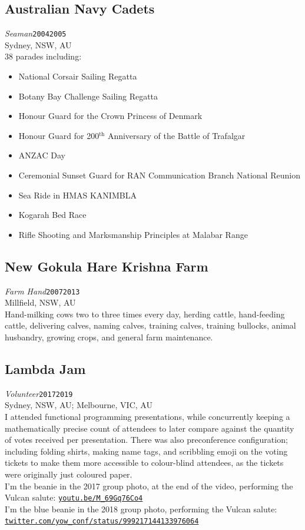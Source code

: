 \documentclass[12pt,a4paper,oneside]{article}
\newcommand{\xp}[6]{{\normalsize\textit{#1}\hfill\texttt{#5}\\\phantom{menace}\hfill#2, #3, #4}\\}
\newcommand{\textapprox}{\raisebox{0.5ex}{\texttildelow}}
\begin{document}
\subsection{Australian Navy Cadets}
\xp{Seaman}{Sydney}{NSW}{AU}{2004\textapprox{}2005}
\\38 parades including:
\begin{itemize}
	\item National Corsair Sailing Regatta
	\item Botany Bay Challenge Sailing Regatta
	\item Honour Guard for the Crown Princess of Denmark
	\item Honour Guard for 200$^\text{th}$ Anniversary of the Battle of Trafalgar
	\item ANZAC Day
	\item Ceremonial Sunset Guard for RAN Communication Branch $\text{National Reunion}$
	\item Sea Ride in HMAS KANIMBLA
	\item Kogarah Bed Race
	\item Rifle Shooting and Marksmanship Principles at Malabar Range
\end{itemize}
\subsection{New Gokula Hare Krishna Farm}
\xp{Farm Hand}{Millfield}{NSW}{AU}{2007\textapprox{}2013}
\\Hand-milking cows two to three times every day, herding cattle, hand-feeding cattle, delivering calves, naming calves, training calves, training bullocks, animal husbandry, growing crops, and general farm maintenance.
\subsection{Lambda Jam}
\normalsize\textit{Volunteer}\hfill\texttt{2017\textapprox{}2019}\\\phantom{menace}\hfill{}Sydney, NSW, AU; Melbourne, VIC, AU
\\I attended functional programming presentations, while concurrently keeping a mathematically precise count of attendees to later compare against the quantity of votes received per presentation. There was also preconference configuration; including folding shirts, making name tags, and scribbling emoji on the voting tickets to make them more accessible to colour-blind attendees, as the tickets were originally just coloured paper.
\\I'm the beanie in the 2017 group photo, at the end of the video, performing the Vulcan salute: \href{https://www.youtube.com/watch?v=M_69Gq76Co4}{\texttt{youtu.be/M\_69Gq76Co4}}%
\\I'm the blue beanie in the 2018 group photo, performing the Vulcan salute: \\\href{https://twitter.com/yow_conf/status/999217144133976064}{\texttt{twitter.com/yow\_conf/status/999217144133976064}}
\newpage
\end{document}
